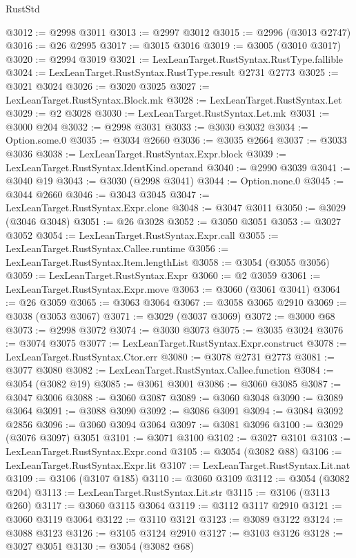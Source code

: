 \begin{lexlean}{RustStd}
\begin{coremodule}
@3012 := @2998 @3011
@3013 := @2997 @3012
@3015 := @2996 (@3013 @2747)
@3016 := @26 @2995
@3017 := @3015 @3016
@3019 := @3005 (@3010 @3017)
@3020 := @2994 @3019
@3021 := LexLeanTarget.RustSyntax.RustType.fallible
@3024 := LexLeanTarget.RustSyntax.RustType.result @2731 @2773
@3025 := @3021 @3024
@3026 := @3020 @3025
@3027 := LexLeanTarget.RustSyntax.Block.mk
@3028 := LexLeanTarget.RustSyntax.Let
@3029 := @2 @3028
@3030 := LexLeanTarget.RustSyntax.Let.mk
@3031 := @3000 @204
@3032 := @2998 @3031
@3033 := @3030 @3032
@3034 := Option.some.{0}
@3035 := @3034 @2660
@3036 := @3035 @2664
@3037 := @3033 @3036
@3038 := LexLeanTarget.RustSyntax.Expr.block
@3039 := LexLeanTarget.RustSyntax.IdentKind.operand
@3040 := @2990 @3039
@3041 := @3040 @19
@3043 := @3030 (@2998 @3041)
@3044 := Option.none.{0}
@3045 := @3044 @2660
@3046 := @3043 @3045
@3047 := LexLeanTarget.RustSyntax.Expr.clone
@3048 := @3047 @3011
@3050 := @3029 (@3046 @3048)
@3051 := @26 @3028
@3052 := @3050 @3051
@3053 := @3027 @3052
@3054 := LexLeanTarget.RustSyntax.Expr.call
@3055 := LexLeanTarget.RustSyntax.Callee.runtime
@3056 := LexLeanTarget.RustSyntax.Item.lengthList
@3058 := @3054 (@3055 @3056)
@3059 := LexLeanTarget.RustSyntax.Expr
@3060 := @2 @3059
@3061 := LexLeanTarget.RustSyntax.Expr.move
@3063 := @3060 (@3061 @3041)
@3064 := @26 @3059
@3065 := @3063 @3064
@3067 := @3058 @3065 @2910
@3069 := @3038 (@3053 @3067)
@3071 := @3029 (@3037 @3069)
@3072 := @3000 @68
@3073 := @2998 @3072
@3074 := @3030 @3073
@3075 := @3035 @3024
@3076 := @3074 @3075
@3077 := LexLeanTarget.RustSyntax.Expr.construct
@3078 := LexLeanTarget.RustSyntax.Ctor.err
@3080 := @3078 @2731 @2773
@3081 := @3077 @3080
@3082 := LexLeanTarget.RustSyntax.Callee.function
@3084 := @3054 (@3082 @19)
@3085 := @3061 @3001
@3086 := @3060 @3085
@3087 := @3047 @3006
@3088 := @3060 @3087
@3089 := @3060 @3048
@3090 := @3089 @3064
@3091 := @3088 @3090
@3092 := @3086 @3091
@3094 := @3084 @3092 @2856
@3096 := @3060 @3094 @3064
@3097 := @3081 @3096
@3100 := @3029 (@3076 @3097) @3051
@3101 := @3071 @3100
@3102 := @3027 @3101
@3103 := LexLeanTarget.RustSyntax.Expr.cond
@3105 := @3054 (@3082 @88)
@3106 := LexLeanTarget.RustSyntax.Expr.lit
@3107 := LexLeanTarget.RustSyntax.Lit.nat
@3109 := @3106 (@3107 @185)
@3110 := @3060 @3109
@3112 := @3054 (@3082 @204)
@3113 := LexLeanTarget.RustSyntax.Lit.str
@3115 := @3106 (@3113 @260)
@3117 := @3060 @3115 @3064
@3119 := @3112 @3117 @2910
@3121 := @3060 @3119 @3064
@3122 := @3110 @3121
@3123 := @3089 @3122
@3124 := @3088 @3123
@3126 := @3105 @3124 @2910
@3127 := @3103 @3126
@3128 := @3027 @3051
@3130 := @3054 (@3082 @68)

\end{coremodule}
\end{lexlean}
